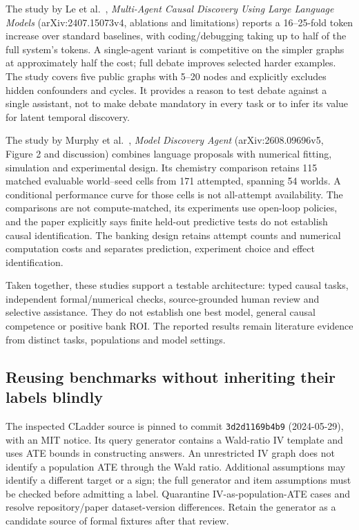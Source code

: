 The study by Le et al.~\citep{v12_la_2407_15073}, \emph{Multi-Agent
Causal Discovery Using Large Language Models} (arXiv:2407.15073v4,
ablations and limitations) reports a 16--25-fold token increase over
standard baselines, with coding/debugging taking up to half of the full
system's tokens. A single-agent variant is competitive on the simpler
graphs at approximately half the cost; full debate improves selected
harder examples. The study covers five public graphs with 5--20 nodes
and explicitly excludes hidden confounders and cycles. It provides a
reason to test debate against a single assistant, not to make debate
mandatory in every task or to infer its value for latent temporal
discovery.

The study by Murphy et al.~\citep{v12_la_2608_09696}, \emph{Model
Discovery Agent} (arXiv:2608.09696v5, Figure 2 and discussion) combines
language proposals with numerical fitting, simulation and experimental
design. Its chemistry comparison retains 115 matched evaluable
world--seed cells from 171 attempted, spanning 54 worlds. A conditional
performance curve for those cells is not all-attempt availability. The
comparisons are not compute-matched, its experiments use open-loop
policies, and the paper explicitly says finite held-out predictive tests
do not establish causal identification. The banking design retains
attempt counts and numerical computation costs and separates prediction,
experiment choice and effect identification.

Taken together, these studies support a testable architecture: typed
causal tasks, independent formal/numerical checks, source-grounded human
review and selective assistance. They do not establish one best model,
general causal competence or positive bank ROI. The reported results
remain literature evidence from distinct tasks, populations and model
settings.

\hypertarget{reusing-benchmarks-without-inheriting-their-labels-blindly}{%
\subsection{Reusing benchmarks without inheriting their labels
blindly}\label{reusing-benchmarks-without-inheriting-their-labels-blindly}}

The inspected CLadder source is pinned to commit \texttt{3d2d1169b4b9}
(2024-05-29), with an MIT notice. Its query generator contains a
Wald-ratio IV template and uses ATE bounds in constructing answers. An
unrestricted IV graph does not identify a population ATE through the
Wald ratio. Additional assumptions may identify a different target or a
sign; the full generator and item assumptions must be checked before
admitting a label. Quarantine IV-as-population-ATE cases and resolve
repository/paper dataset-version differences. Retain the generator as a
candidate source of formal fixtures after that review.

